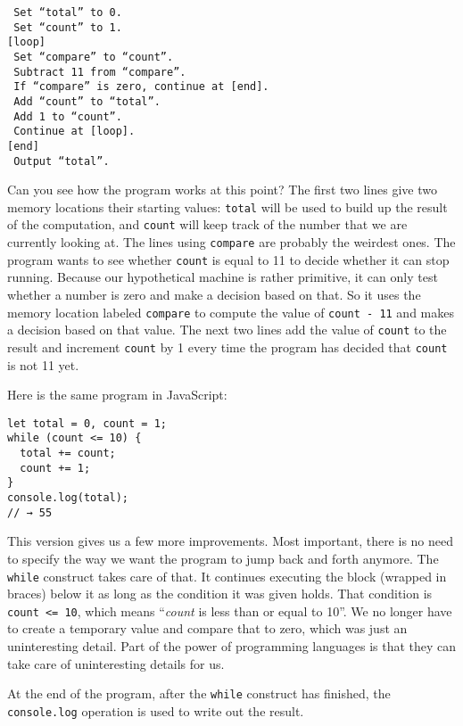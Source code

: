 \begin{lstlisting}
 Set “total” to 0.
 Set “count” to 1.
[loop]
 Set “compare” to “count”.
 Subtract 11 from “compare”.
 If “compare” is zero, continue at [end].
 Add “count” to “total”.
 Add 1 to “count”.
 Continue at [loop].
[end]
 Output “total”.
\end{lstlisting}
\noindent{}

Can you see how the program works at this point? The first two lines give two memory locations their starting values: \lstinline`total` will be used to build up the result of the computation, and \lstinline`count` will keep track of the number that we are currently looking at. The lines using \lstinline`compare` are probably the weirdest ones. The program wants to see whether \lstinline`count` is equal to 11 to decide whether it can stop running. Because our hypothetical machine is rather primitive, it can only test whether a number is zero and make a decision based on that. So it uses the memory location labeled \lstinline`compare` to compute the value of \lstinline`count - 11` and makes a decision based on that value. The next two lines add the value of \lstinline`count` to the result and increment \lstinline`count` by 1 every time the program has decided that \lstinline`count` is not 11 yet.

Here is the same program in JavaScript:

\begin{lstlisting}
let total = 0, count = 1;
while (count <= 10) {
  total += count;
  count += 1;
}
console.log(total);
// → 55
\end{lstlisting}
\noindent{}

This version gives us a few more improvements. Most important, there is no need to specify the way we want the program to jump back and forth anymore. The \lstinline`while` construct takes care of that. It continues executing the block (wrapped in braces) below it as long as the condition it was given holds. That condition is \lstinline`count <= 10`, which means “\emph{count} is less than or equal to 10”. We no longer have to create a temporary value and compare that to zero, which was just an uninteresting detail. Part of the power of programming languages is that they can take care of uninteresting details for us.

At the end of the program, after the \lstinline`while` construct has finished, the \lstinline`console.log` operation is used to write out the result.

